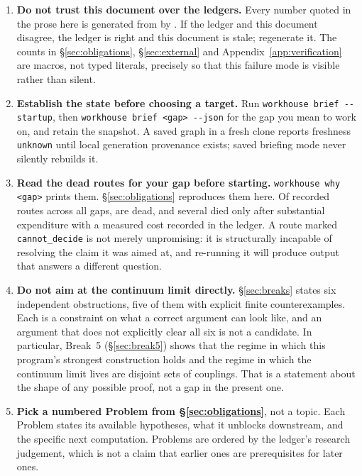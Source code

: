 \begin{enumerate}
  \item \textbf{Do not trust this document over the ledgers.} Every
    number quoted in the prose here is generated from
     by .
    If the ledger and this document disagree, the ledger is right and
    this document is stale; regenerate it. The counts in
    \S\ref{sec:obligations}, \S\ref{sec:external} and
    Appendix~\ref{app:verification} are macros, not typed literals,
    precisely so that this failure mode is visible rather than silent.

  \item \textbf{Establish the state before choosing a target.} Run
    \texttt{workhouse brief -{}-startup}, then \texttt{workhouse brief <gap> -{}-json}
    for the gap you mean to work on, and retain the snapshot. A saved
    graph in a fresh clone reports freshness \texttt{unknown} until local
    generation provenance exists; saved briefing mode never silently
    rebuilds it.

  \item \textbf{Read the dead routes for your gap before starting.}
    \texttt{workhouse why <gap>} prints them. \S\ref{sec:obligations}
    reproduces them here. Of \RouteTotal{} recorded routes across all
    gaps, \RouteDead{} are dead, and several died only after substantial
    expenditure with a measured cost recorded in the ledger. A route
    marked \texttt{cannot\_decide} is not merely unpromising: it is
    structurally incapable of resolving the claim it was aimed at, and
    re-running it will produce output that answers a different question.

  \item \textbf{Do not aim at the continuum limit directly.}
    \S\ref{sec:breaks} states six independent obstructions, five of them
    with explicit finite counterexamples. Each is a constraint on what a
    correct argument can look like, and an argument that does not
    explicitly clear all six is not a candidate. In particular, Break~5
    (\S\ref{sec:break5}) shows that the regime in which this program's
    strongest construction holds and the regime in which the continuum
    limit lives are disjoint sets of couplings. That is a statement about
    the shape of any possible proof, not a gap in the present one.

  \item \textbf{Pick a numbered Problem from \S\ref{sec:obligations}}, not
    a topic. Each Problem states its available hypotheses, what it
    unblocks downstream, and the specific next computation. Problems are
    ordered by the ledger's research judgement, which is not a claim that
    earlier ones are prerequisites for later ones.


\end{enumerate}
